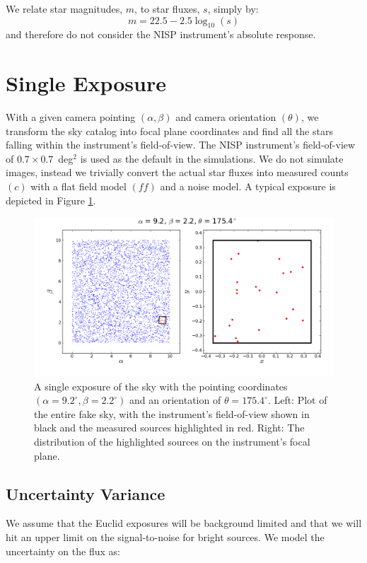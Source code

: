 \documentclass[manuscript]{aastex}
\begin{document}
We relate star magnitudes, $m$, to star fluxes, $s$, simply by:
\begin{displaymath}
m = 22.5 - 2.5\log_{10}(s)
\end{displaymath}
and therefore do not consider the NISP instrument's absolute response.

\section{Single Exposure}
With a given camera pointing $(\alpha, \beta)$ and camera orientation $(\theta)$, we transform the sky catalog into focal plane coordinates and find all the stars falling within the instrument's field-of-view. The NISP instrument's field-of-view of $0.7 \times 0.7$~deg$^{2}$ is used as the default in the simulations. We do not simulate images, instead we trivially convert the actual star fluxes into measured counts $(c)$ with a flat field model $(ff)$ and a noise model. A typical exposure is depicted in Figure \ref{fig:camera}.

\begin{figure}[ht]
\begin{center}
\includegraphics[width=\textwidth]{camera_image.png}
\end{center}
\caption{A single exposure of the sky with the pointing coordinates $(\alpha = 9.2^\circ, \beta = 2.2^\circ)$ and an orientation of $\theta = 175.4^\circ$. Left: Plot of the entire fake sky, with the instrument's field-of-view shown in black and the measured sources highlighted in red. Right: The distribution of the highlighted sources on the instrument's focal plane. \label{fig:camera}}
\end{figure}

\subsection{Uncertainty Variance}
We assume that the Euclid exposures will be background limited and that we will hit an upper limit on the signal-to-noise for bright sources. We model the uncertainty on the flux as:
\end{document}
